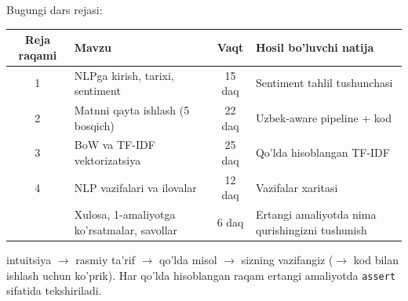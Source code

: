 \documentclass[aspectratio=169,11pt]{beamer}
\begin{document}
\begin{frame}{Bugungi dars rejasi:}
  \begin{center}
  \small
  \begin{tabular}{c p{3.8cm} c p{3.6cm}}
    \toprule
    \textbf{Reja raqami}& \textbf{Mavzu} & \textbf{Vaqt} & \textbf{Hosil bo'luvchi natija}\\
    \midrule
    1 & NLPga kirish, tarixi, sentiment & 15 daq & Sentiment tahlil tushunchasi \\
    2 & Matnni qayta ishlash (5 bosqich) & 22 daq & Uzbek-aware pipeline + kod \\
    3 & BoW va TF-IDF vektorizatsiya & 25 daq & Qo'lda hisoblangan TF-IDF \\
    4 & NLP vazifalari va ilovalar & 12 daq & Vazifalar xaritasi \\
    \midrule
      & Xulosa, 1-amaliyotga ko'rsatmalar, savollar& 6 daq & Ertangi amaliyotda nima qurishingizni tushunish\\
    \bottomrule
  \end{tabular}
  \end{center}
  \vspace{4pt}
  \begin{tcolorbox}[warnbox,title=Har bir reja qanday qurilgan]
    \footnotesize\sloppy
    intuitsiya $\to$ rasmiy ta'rif $\to$ qo'lda misol $\to$ sizning vazifangiz
    ($\to$ kod bilan ishlash uchun ko'prik). Har qo'lda hisoblangan raqam ertangi amaliyotda
    \texttt{assert} sifatida tekshiriladi.
  \end{tcolorbox}
\end{frame}
\end{document}
